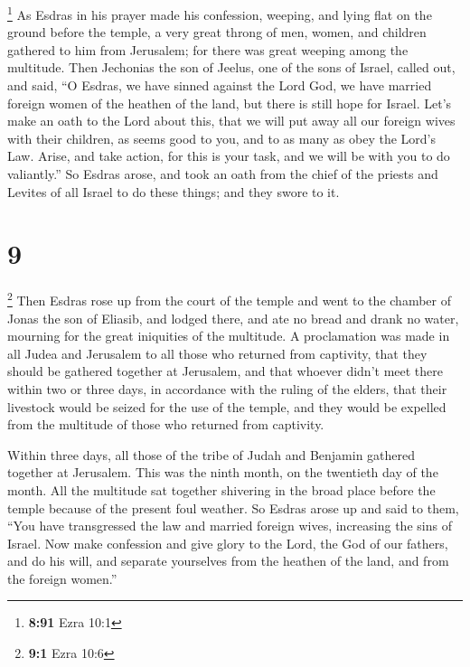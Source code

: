  \footnote{\textbf{8:91} Ezra 10:1} As Esdras in his
prayer made his confession, weeping, and lying flat on the ground before
the temple, a very great throng of men, women, and children gathered to
him from Jerusalem; for there was great weeping among the multitude.
 Then Jechonias the son of Jeelus, one of the sons of
Israel, called out, and said, ``O Esdras, we have sinned against the
Lord God, we have married foreign women of the heathen of the land, but
there is still hope for Israel.  Let's make an oath to
the Lord about this, that we will put away all our foreign wives with
their children,  as seems good to you, and to as many as
obey the Lord's Law.  Arise, and take action, for this is
your task, and we will be with you to do valiantly.''  So
Esdras arose, and took an oath from the chief of the priests and Levites
of all Israel to do these things; and they swore to it.

\hypertarget{section-8}{%
\section{9}\label{section-8}}

 \footnote{\textbf{9:1} Ezra 10:6} Then Esdras rose up
from the court of the temple and went to the chamber of Jonas the son of
Eliasib,  and lodged there, and ate no bread and drank no
water, mourning for the great iniquities of the multitude.
 A proclamation was made in all Judea and Jerusalem to all
those who returned from captivity, that they should be gathered together
at Jerusalem,  and that whoever didn't meet there within
two or three days, in accordance with the ruling of the elders, that
their livestock would be seized for the use of the temple, and they
would be expelled from the multitude of those who returned from
captivity.

 Within three days, all those of the tribe of Judah and
Benjamin gathered together at Jerusalem. This was the ninth month, on
the twentieth day of the month.  All the multitude sat
together shivering in the broad place before the temple because of the
present foul weather.  So Esdras arose up and said to
them, ``You have transgressed the law and married foreign wives,
increasing the sins of Israel.  Now make confession and
give glory to the Lord, the God of our fathers,  and do
his will, and separate yourselves from the heathen of the land, and from
the foreign women.''

